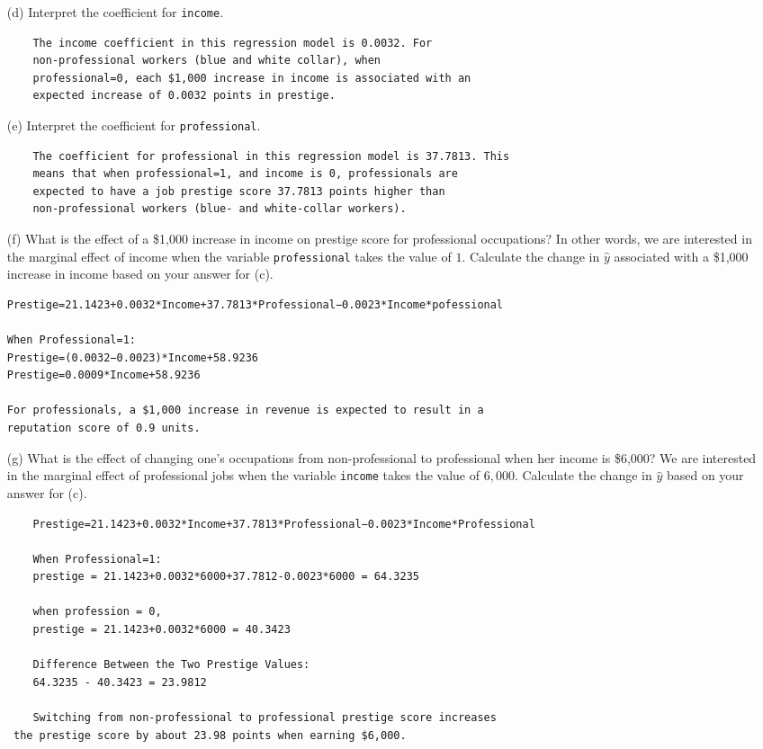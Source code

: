 \documentclass[12pt,letterpaper]{article}
\begin{document}
\begin{enumerate}
	\item [(d)]
	Interpret the coefficient for \texttt{income}.
	\begin{verbatim}
	The income coefficient in this regression model is 0.0032. For
	non-professional workers (blue and white collar), when 
	professional=0, each $1,000 increase in income is associated with an
	expected increase of 0.0032 points in prestige.
    \end{verbatim}	

	\item [(e)]
	Interpret the coefficient for \texttt{professional}.
	\begin{verbatim}
	The coefficient for professional in this regression model is 37.7813. This
	means that when professional=1, and income is 0, professionals are
	expected to have a job prestige score 37.7813 points higher than
	non-professional workers (blue- and white-collar workers).
	\end{verbatim}	
	\newpage
	\item [(f)]
	What is the effect of a \$1,000 increase in income on prestige score for professional occupations? In other words, we are interested in the marginal effect of income when the variable \texttt{professional} takes the value of $1$. Calculate the change in $\hat{y}$ associated with a \$1,000 increase in income based on your answer for (c).
	\begin{verbatim}
Prestige=21.1423+0.0032*Income+37.7813*Professional−0.0023*Income*pofessional
     
When Professional=1:
Prestige=(0.0032−0.0023)*Income+58.9236
Prestige=0.0009*Income+58.9236
     
For professionals, a $1,000 increase in revenue is expected to result in a
reputation score of 0.9 units.
	\end{verbatim}
	
	\item [(g)]
	What is the effect of changing one's occupations from non-professional to professional when her income is \$6,000? We are interested in the marginal effect of professional jobs when the variable \texttt{income} takes the value of $6,000$. Calculate the change in $\hat{y}$ based on your answer for (c).
	\begin{verbatim}
	Prestige=21.1423+0.0032*Income+37.7813*Professional−0.0023*Income*Professional
	
	When Professional=1:
	prestige = 21.1423+0.0032*6000+37.7812-0.0023*6000 = 64.3235
	
	when profession = 0,
	prestige = 21.1423+0.0032*6000 = 40.3423
	
	Difference Between the Two Prestige Values:
	64.3235 - 40.3423 = 23.9812
	
	Switching from non-professional to professional prestige score increases
 the prestige score by about 23.98 points when earning $6,000.
	
\end{verbatim}
	
\end{enumerate}
\end{document}
